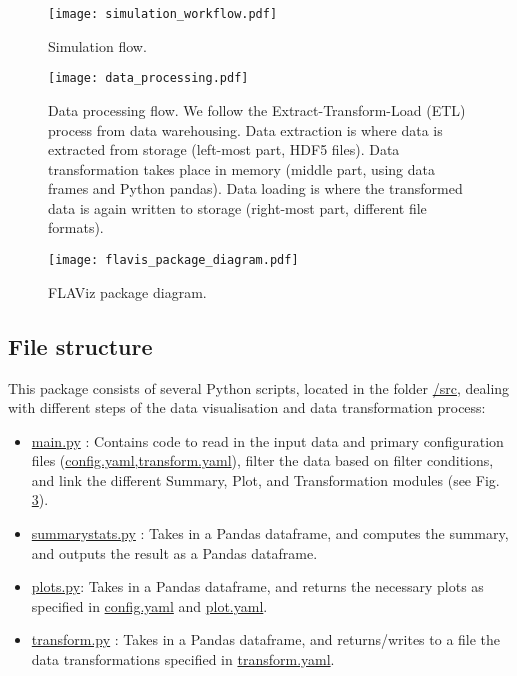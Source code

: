 \documentclass[10pt,a4paper]{article}
\begin{document}
\begin{figure}
\graphicspath{{./png/}}
%
\begin{boxedminipage}{14cm}
\centering\leavevmode
\texttt{[image: simulation\_workflow.pdf]} 
\end{boxedminipage}
\label{Fig: Simulation workflow}
\caption{\footnotesize Simulation flow.}
\end{figure}

\begin{figure}
\centering\leavevmode
\graphicspath{{./png/}}
%
\begin{boxedminipage}{14cm}
\centering\leavevmode
\texttt{[image: data\_processing.pdf]} 
\end{boxedminipage}
\label{Fig: Data processing}
\caption{\footnotesize Data processing flow. We follow the Extract-Transform-Load (ETL) process from data warehousing. Data extraction is where data is extracted from storage (left-most part, HDF5 files). Data transformation takes place in memory (middle part, using data frames and Python pandas). Data loading is where the transformed data is again written to storage (right-most part, different file formats).}
\end{figure}


\begin{figure}[Htp!]
\centering\leavevmode
\graphicspath{{./png/}}
%
\begin{boxedminipage}{16cm}
\centering\leavevmode
\texttt{[image: flavis\_package\_diagram.pdf]} 
\end{boxedminipage}
\label{Fig: Package diagram}
\caption{\footnotesize FLAViz package diagram.}
\end{figure}



\subsection{File structure}

This package consists of several Python scripts, located in the folder \url{/src}, dealing with different steps of the data visualisation and data transformation process:
\begin{itemize}
\item \url{main.py} : Contains code to read in the input data and primary configuration files (\url{config.yaml,transform.yaml}), filter the data based on filter conditions, and link the different Summary, Plot, and Transformation modules (see Fig. \ref{Fig: Package diagram}).

\item \url{summarystats.py} : Takes in a Pandas dataframe, and computes the summary, and outputs the result as a Pandas dataframe.

\item \url{plots.py}: Takes in a Pandas dataframe, and returns the necessary plots as specified in \url{config.yaml} and \url{plot.yaml}.

\item \url{transform.py} : Takes in a Pandas dataframe, and returns/writes to a file the data transformations specified in \url{transform.yaml}.
\end{itemize}
\end{document}
